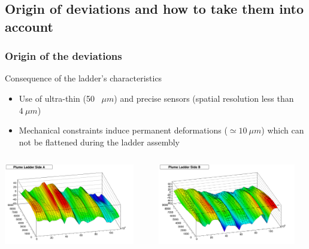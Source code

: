 \documentclass{beamer}
\begin{document}
\subsection{Origin of deviations and how to take them into account}
\begin{frame}
  \frametitle{Origin of the deviations}

  \vspace{-0.2cm}
  \begin{block}{Consequence of the ladder's characteristics}
    \begin{itemize}
      \item Use of ultra-thin (50 \ $\mu m$) and precise sensors (spatial resolution less than $4 \ \mu m$)
      \item Mechanical constraints induce permanent deformations ($\simeq 10 \ \mu m$) which can not be flattened during the ladder assembly
    \end{itemize}
  \end{block}

  \vspace{-0.2cm}

  \vspace{-0.3cm}
  \begin{columns}[c]
    \begin{column}{6cm}
      \begin{center}
        \includegraphics[width = 5.7cm]{Pictures/SideAPlumeLadder2010_M20.png}
      \end{center}
    \end{column}

    \begin{column}{6cm}
      \begin{center}
        \includegraphics[width = 6cm]{Pictures/SideBPlumeLadder2010_M20.png}
      \end{center}
    \end{column}
  \end{columns}

\end{frame}
\end{document}
